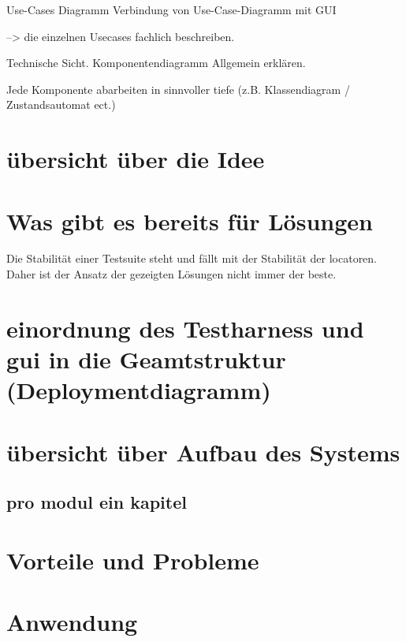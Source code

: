 Use-Cases Diagramm 
Verbindung von Use-Case-Diagramm mit GUI

--> die einzelnen Usecases fachlich beschreiben.

Technische Sicht. 
Komponentendiagramm Allgemein erklären.

Jede Komponente abarbeiten in sinnvoller tiefe (z.B. Klassendiagram / Zustandsautomat ect.)


\section{übersicht über die Idee}


\section{Was gibt es bereits für Lösungen}
Die Stabilität einer Testsuite steht und fällt mit der Stabilität der locatoren. Daher ist der Ansatz der gezeigten Lösungen nicht immer der beste.


\section{einordnung des Testharness und gui in die Geamtstruktur (Deploymentdiagramm)}

\section{übersicht über Aufbau des Systems}

\subsection{pro modul ein kapitel}

\section{Vorteile und Probleme}

\section{Anwendung}
